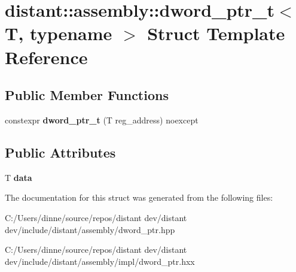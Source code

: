 \hypertarget{structdistant_1_1assembly_1_1dword__ptr__t}{}\section{distant\+:\+:assembly\+:\+:dword\+\_\+ptr\+\_\+t$<$ T, typename $>$ Struct Template Reference}
\label{structdistant_1_1assembly_1_1dword__ptr__t}
\subsection*{Public Member Functions}
\begin{DoxyCompactItemize}
\item 
\mbox{\label{structdistant_1_1assembly_1_1dword__ptr__t_ac9e3696a6fed8f916403264c5ec7de75}} 
constexpr {\bfseries dword\+\_\+ptr\+\_\+t} (T reg\+\_\+address) noexcept
\end{DoxyCompactItemize}
\subsection*{Public Attributes}
\begin{DoxyCompactItemize}
\item 
\mbox{\label{structdistant_1_1assembly_1_1dword__ptr__t_afad65828b73d9a40e84777aeae76a2d9}} 
T {\bfseries data}
\end{DoxyCompactItemize}


The documentation for this struct was generated from the following files\+:\begin{DoxyCompactItemize}
\item 
C\+:/\+Users/dinne/source/repos/distant dev/distant dev/include/distant/assembly/dword\+\_\+ptr.\+hpp\item 
C\+:/\+Users/dinne/source/repos/distant dev/distant dev/include/distant/assembly/impl/dword\+\_\+ptr.\+hxx\end{DoxyCompactItemize}
